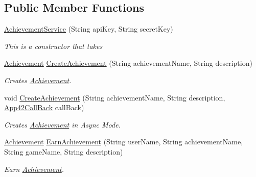 \subsection*{Public Member Functions}
\begin{DoxyCompactItemize}
\item 
\hyperlink{classcom_1_1shephertz_1_1app42_1_1paas_1_1sdk_1_1csharp_1_1achievement_1_1_achievement_service_ae141294f239cd4e1f1272f9905243ccf}{Achievement\+Service} (String api\+Key, String secret\+Key)
\begin{DoxyCompactList}\small\item\em This is a constructor that takes \end{DoxyCompactList}\item 
\hyperlink{classcom_1_1shephertz_1_1app42_1_1paas_1_1sdk_1_1csharp_1_1achievement_1_1_achievement}{Achievement} \hyperlink{classcom_1_1shephertz_1_1app42_1_1paas_1_1sdk_1_1csharp_1_1achievement_1_1_achievement_service_aa27354c785f0b49f7b85b8c3b935272e}{Create\+Achievement} (String achievement\+Name, String description)
\begin{DoxyCompactList}\small\item\em Creates \hyperlink{classcom_1_1shephertz_1_1app42_1_1paas_1_1sdk_1_1csharp_1_1achievement_1_1_achievement}{Achievement}. \end{DoxyCompactList}\item 
void \hyperlink{classcom_1_1shephertz_1_1app42_1_1paas_1_1sdk_1_1csharp_1_1achievement_1_1_achievement_service_a10fc3d75a4b96b3a44147899d2dbd060}{Create\+Achievement} (String achievement\+Name, String description, \hyperlink{interfacecom_1_1shephertz_1_1app42_1_1paas_1_1sdk_1_1csharp_1_1_app42_call_back}{App42\+Call\+Back} call\+Back)
\begin{DoxyCompactList}\small\item\em Creates \hyperlink{classcom_1_1shephertz_1_1app42_1_1paas_1_1sdk_1_1csharp_1_1achievement_1_1_achievement}{Achievement} in Async Mode. \end{DoxyCompactList}\item 
\hyperlink{classcom_1_1shephertz_1_1app42_1_1paas_1_1sdk_1_1csharp_1_1achievement_1_1_achievement}{Achievement} \hyperlink{classcom_1_1shephertz_1_1app42_1_1paas_1_1sdk_1_1csharp_1_1achievement_1_1_achievement_service_a5911439bca19493aace04a3e5de09774}{Earn\+Achievement} (String user\+Name, String achievement\+Name, String game\+Name, String description)
\begin{DoxyCompactList}\small\item\em Earn \hyperlink{classcom_1_1shephertz_1_1app42_1_1paas_1_1sdk_1_1csharp_1_1achievement_1_1_achievement}{Achievement}. \end{DoxyCompactList}\item 

\end{DoxyCompactItemize}
